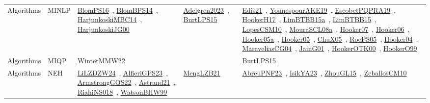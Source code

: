 {\begin{longtable}{lp{3cm}>{\raggedright\arraybackslash}p{6cm}>{\raggedright\arraybackslash}p{6cm}>{\raggedright\arraybackslash}p{8cm}}
\index{MINLP}\index{Algorithms!MINLP}Algorithms & MINLP & \href{../works/BlomPS16.pdf}{BlomPS16}~\cite{BlomPS16}, \href{../works/BlomBPS14.pdf}{BlomBPS14}~\cite{BlomBPS14}, \href{../works/HarjunkoskiMBC14.pdf}{HarjunkoskiMBC14}~\cite{HarjunkoskiMBC14}, \href{../works/HarjunkoskiJG00.pdf}{HarjunkoskiJG00}~\cite{HarjunkoskiJG00} & \href{../works/Adelgren2023.pdf}{Adelgren2023}~\cite{Adelgren2023}, \href{../works/BurtLPS15.pdf}{BurtLPS15}~\cite{BurtLPS15} & \href{../works/Edis21.pdf}{Edis21}~\cite{Edis21}, \href{../works/YounespourAKE19.pdf}{YounespourAKE19}~\cite{YounespourAKE19}, \href{../works/EscobetPQPRA19.pdf}{EscobetPQPRA19}~\cite{EscobetPQPRA19}, \href{../works/HookerH17.pdf}{HookerH17}~\cite{HookerH17}, \href{../works/LimBTBB15a.pdf}{LimBTBB15a}~\cite{LimBTBB15a}, \href{../works/LimBTBB15.pdf}{LimBTBB15}~\cite{LimBTBB15}, \href{../works/LopesCSM10.pdf}{LopesCSM10}~\cite{LopesCSM10}, \href{../works/MouraSCL08a.pdf}{MouraSCL08a}~\cite{MouraSCL08a}, \href{../works/Hooker07.pdf}{Hooker07}~\cite{Hooker07}, \href{../works/Hooker06.pdf}{Hooker06}~\cite{Hooker06}, \href{../works/Hooker05a.pdf}{Hooker05a}~\cite{Hooker05a}, \href{../works/Hooker05.pdf}{Hooker05}~\cite{Hooker05}, \href{../works/ChuX05.pdf}{ChuX05}~\cite{ChuX05}, \href{../works/RoePS05.pdf}{RoePS05}~\cite{RoePS05}, \href{../works/Hooker04.pdf}{Hooker04}~\cite{Hooker04}, \href{../works/MaraveliasCG04.pdf}{MaraveliasCG04}~\cite{MaraveliasCG04}, \href{../works/JainG01.pdf}{JainG01}~\cite{JainG01}, \href{../works/HookerOTK00.pdf}{HookerOTK00}~\cite{HookerOTK00}, \href{../works/HookerO99.pdf}{HookerO99}~\cite{HookerO99}\\
\index{MIQP}\index{Algorithms!MIQP}Algorithms & MIQP & \href{../works/WinterMMW22.pdf}{WinterMMW22}~\cite{WinterMMW22} &  & \href{../works/BurtLPS15.pdf}{BurtLPS15}~\cite{BurtLPS15}\\
\index{NEH}\index{Algorithms!NEH}Algorithms & NEH & \href{../works/LiLZDZW24.pdf}{LiLZDZW24}~\cite{LiLZDZW24}, \href{../works/AlfieriGPS23.pdf}{AlfieriGPS23}~\cite{AlfieriGPS23}, \href{../works/ArmstrongGOS22.pdf}{ArmstrongGOS22}~\cite{ArmstrongGOS22}, \href{../works/Astrand21.pdf}{Astrand21}~\cite{Astrand21}, \href{../works/RiahiNS018.pdf}{RiahiNS018}~\cite{RiahiNS018}, \href{../works/WatsonBHW99.pdf}{WatsonBHW99}~\cite{WatsonBHW99} & \href{../works/MengLZB21.pdf}{MengLZB21}~\cite{MengLZB21} & \href{../works/AbreuPNF23.pdf}{AbreuPNF23}~\cite{AbreuPNF23}, \href{../works/IsikYA23.pdf}{IsikYA23}~\cite{IsikYA23}, \href{../works/ZhouGL15.pdf}{ZhouGL15}~\cite{ZhouGL15}, \href{../works/ZeballosCM10.pdf}{ZeballosCM10}~\cite{ZeballosCM10}\\

\end{longtable}}
